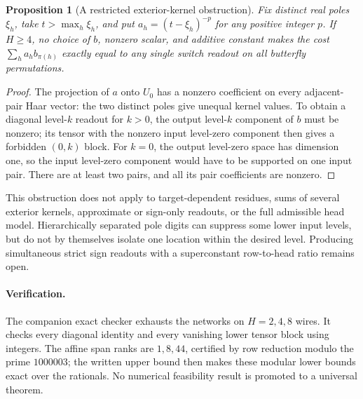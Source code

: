 \documentclass[11pt]{article}
\newtheorem{proposition}{Proposition}
\begin{document}
\begin{proposition}[A restricted exterior-kernel obstruction]
Fix distinct real poles $\xi_h$, take $t>\max_h\xi_h$, and put
$a_h=(t-\xi_h)^{-p}$ for any positive integer $p$.
If $H\geq4$, no choice of $b$, nonzero scalar, and additive constant
makes the cost $\sum_h a_h b_{\pi(h)}$ exactly equal to any single
switch readout on all butterfly permutations.
\end{proposition}
\begin{proof}
The projection of $a$ onto $U_0$ has a nonzero coefficient on every
adjacent-pair Haar vector: the two distinct poles give unequal kernel
values. To obtain a diagonal level-$k$ readout for $k>0$, the output
level-$k$ component of $b$ must be nonzero; its tensor with the nonzero
input level-zero component then gives a forbidden $(0,k)$ block.
For $k=0$, the output level-zero space has dimension one, so the input
level-zero component would have to be supported on one input pair.
There are at least two pairs, and all its pair coefficients are nonzero.
\end{proof}

This obstruction does not apply to target-dependent residues, sums of
several exterior kernels, approximate or sign-only readouts, or the full
admissible head model. Hierarchically separated pole digits can suppress
some lower input levels, but do not by themselves isolate one location
within the desired level. Producing simultaneous strict sign readouts
with a superconstant row-to-head ratio remains open.

\paragraph{Verification.}
The companion exact checker exhausts the networks on $H=2,4,8$ wires.
It checks every diagonal identity and every vanishing lower tensor
block using integers. The affine span ranks are $1,8,44$, certified
by row reduction modulo the prime $1000003$; the written upper bound
then makes these modular lower bounds exact over the rationals.
No numerical feasibility result is promoted to a universal theorem.
\end{document}

